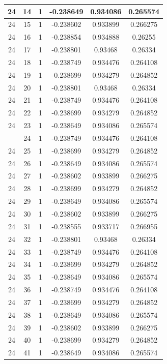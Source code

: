 \documentclass[12pt,a4paper]{article}
\numberwithin{equation}{section}
\numberwithin{figure}{section}
\numberwithin{table}{section}
\begin{document}
\begin{longtable}{|c|c|c|c|c|c|}
24 & 14 & 1 & -0.238649 & 0.934086 & 0.265574 \\ \hline
24 & 15 & 1 & -0.238602 & 0.933899 & 0.266275 \\ \hline
24 & 16 & 1 & -0.238854 & 0.934888 & 0.26255 \\ \hline
24 & 17 & 1 & -0.238801 & 0.93468 & 0.26334 \\ \hline
24 & 18 & 1 & -0.238749 & 0.934476 & 0.264108 \\ \hline
24 & 19 & 1 & -0.238699 & 0.934279 & 0.264852 \\ \hline
24 & 20 & 1 & -0.238801 & 0.93468 & 0.26334 \\ \hline
24 & 21 & 1 & -0.238749 & 0.934476 & 0.264108 \\ \hline
24 & 22 & 1 & -0.238699 & 0.934279 & 0.264852 \\ \hline
24 & 23 & 1 & -0.238649 & 0.934086 & 0.265574 \\ \hline
\pagebreak
24 & 24 & 1 & -0.238749 & 0.934476 & 0.264108 \\ \hline
24 & 25 & 1 & -0.238699 & 0.934279 & 0.264852 \\ \hline
24 & 26 & 1 & -0.238649 & 0.934086 & 0.265574 \\ \hline
24 & 27 & 1 & -0.238602 & 0.933899 & 0.266275 \\ \hline
24 & 28 & 1 & -0.238699 & 0.934279 & 0.264852 \\ \hline
24 & 29 & 1 & -0.238649 & 0.934086 & 0.265574 \\ \hline
24 & 30 & 1 & -0.238602 & 0.933899 & 0.266275 \\ \hline
24 & 31 & 1 & -0.238555 & 0.933717 & 0.266955 \\ \hline
24 & 32 & 1 & -0.238801 & 0.93468 & 0.26334 \\ \hline
24 & 33 & 1 & -0.238749 & 0.934476 & 0.264108 \\ \hline
24 & 34 & 1 & -0.238699 & 0.934279 & 0.264852 \\ \hline
24 & 35 & 1 & -0.238649 & 0.934086 & 0.265574 \\ \hline
24 & 36 & 1 & -0.238749 & 0.934476 & 0.264108 \\ \hline
24 & 37 & 1 & -0.238699 & 0.934279 & 0.264852 \\ \hline
24 & 38 & 1 & -0.238649 & 0.934086 & 0.265574 \\ \hline
24 & 39 & 1 & -0.238602 & 0.933899 & 0.266275 \\ \hline
24 & 40 & 1 & -0.238699 & 0.934279 & 0.264852 \\ \hline
24 & 41 & 1 & -0.238649 & 0.934086 & 0.265574 \\ \hline

\end{longtable}
\end{document}
